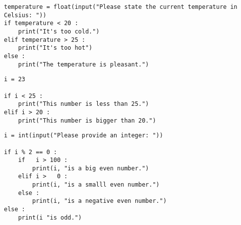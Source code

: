 
\begin{frame}[fragile]
%
\begin{codebox}
\begin{verbatim}
temperature = float(input("Please state the current temperature in Celsius: "))
if temperature < 20 :
    print("It's too cold.")
elif temperature > 25 :
    print("It's too hot")
else :
    print("The temperature is pleasant.")
\end{verbatim}
\end{codebox}
%
\begin{warnbox}[Erroneous Code: \texttt{elif}, leftupper=6mm]
\begin{verbatim}
i = 23

if i < 25 :
    print("This number is less than 25.")
elif i > 20 :
    print("This number is bigger than 20.")
\end{verbatim}
\end{warnbox}
%
\end{frame}


\begin{frame}[fragile]
%
\begin{codebox}
\begin{verbatim}
i = int(input("Please provide an integer: "))

if i % 2 == 0 :
    if   i > 100 :
        print(i, "is a big even number.")
    elif i >   0 :
        print(i, "is a smalll even number.")
    else :
        print(i, "is a negative even number.")
else :
    print(i "is odd.")
\end{verbatim}
\end{codebox}
%
\end{frame}


